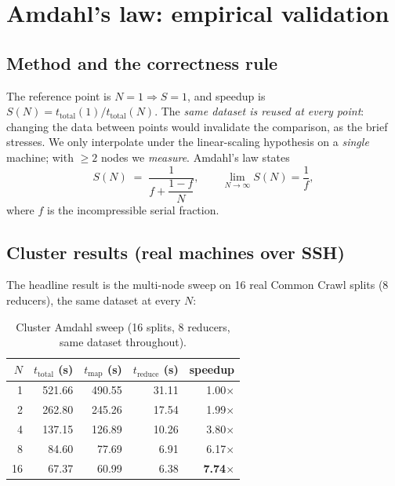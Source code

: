 \documentclass[11pt,a4paper]{article}
\begin{document}
\section{Amdahl's law: empirical validation}\label{sec:amdahl}

\subsection{Method and the correctness rule}

The reference point is $N=1\Rightarrow S=1$, and speedup is
$S(N) = t_{\text{total}}(1) / t_{\text{total}}(N)$. The
\emph{same dataset is reused at every point}: changing the data between points
would invalidate the comparison, as the brief stresses. We only interpolate
under the linear-scaling hypothesis on a \emph{single} machine; with $\ge 2$
nodes we \emph{measure}. Amdahl's law states
\[
S(N) \;=\; \frac{1}{f + \dfrac{1-f}{N}},
\qquad \lim_{N\to\infty} S(N) = \frac{1}{f},
\]
where $f$ is the incompressible serial fraction.

\subsection{Cluster results (real machines over SSH)}

The headline result is the multi-node sweep on 16 real Common Crawl splits
(8 reducers), the same dataset at every $N$:

\begin{table}[H]
\centering
\small
\renewcommand{\arraystretch}{1.2}
\begin{tabular}{@{}rrrrr@{}}
\toprule
$N$ & $t_{\text{total}}$ (s) & $t_{\text{map}}$ (s) & $t_{\text{reduce}}$ (s) & speedup\\
\midrule
1  & 521.66 & 490.55 & 31.11 & 1.00$\times$\\
2  & 262.80 & 245.26 & 17.54 & 1.99$\times$\\
4  & 137.15 & 126.89 & 10.26 & 3.80$\times$\\
8  &  84.60 &  77.69 &  6.91 & 6.17$\times$\\
16 &  67.37 &  60.99 &  6.38 & \textbf{7.74$\times$}\\
\bottomrule
\end{tabular}
\caption{Cluster Amdahl sweep (16 splits, 8 reducers, same dataset throughout).}
\label{tab:cluster}
\end{table}
\end{document}
